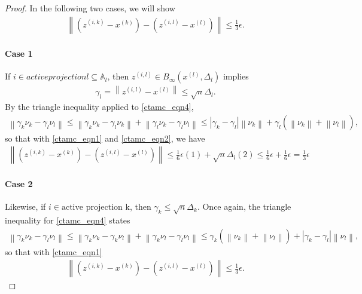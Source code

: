 \documentclass{article}
\theoremstyle{case}
\numberwithin{theorem}{subsection}
\newcommand{\activeconstraintsl}{{\mathbb A_{l}}}
\newcommand{\dk}{\Delta_k}
\newcommand{\dl}{\Delta_l}
\newcommand{\xk}{x^{(k)}}
\newcommand{\xl}{{x^{(l)}}}
\newcommand{\zik}{{z^{(i, k)}}}
\newcommand{\zil}{{z^{(i, l)}}}
\newcommand{\activeprojk}{{\textrm{active projection k}}}
\newcommand{\activeprojl}{{active projection l}}
\begin{document}
\begin{proof}
In the following two cases, we will show
\begin{align*}
\left\|\left(\zik - \xk\right) - \left(\zil - \xl\right)\right\| \le \frac 1 3 \epsilon.
\end{align*}
\paragraph{Case 1}
If $i \in \activeprojl \subseteq \activeconstraintsl$, then $\zil \in B_{\infty}\left(\xl, \dl\right)$ implies
\begin{align}
\gamma_l = \left\|\zil - \xl\right\| \le \sqrt{n}\dl. \label{ctamc_eqn2}
\end{align}
By the triangle inequality applied to \cref{ctamc_eqn4},
\begin{align*}
\left\|\gamma_k \nu_k - \gamma_l \nu_l \right\| 
\le \left\|\gamma_k \nu_k - \gamma_l \nu_k \right\| + \left\| \gamma_l \nu_k - \gamma_l \nu_l \right\| 
\le \left|\gamma_k - \gamma_l\right|\left\|\nu_k\right\| + \gamma_l \left(\left\|\nu_k\right\| + \left\|\nu_l \right\|\right),
\end{align*}
so that with \cref{ctamc_eqn1} and \cref{ctamc_eqn2}, we have
\begin{align*}
\left\|\left(\zik - \xk\right) - \left(\zil - \xl\right)\right\|
\le \frac 1 6 \epsilon (1) + \sqrt{n} \dl (2)
\le \frac 1 6 \epsilon + \frac 1 6 \epsilon = \frac 1 3 \epsilon
\end{align*}
\paragraph{Case 2}
Likewise, if $i \in \activeprojk$, then $\gamma_k \le \sqrt{n}\dk$.
Once again, the triangle inequality for \cref{ctamc_eqn4} states
\begin{align*}
\left\|\gamma_k \nu_k - \gamma_l \nu_l \right\| 
\le \left\|\gamma_k \nu_k - \gamma_k \nu_l \right\| + \left\| \gamma_k \nu_l - \gamma_l \nu_l \right\| 
\le \gamma_k \left(\left\|\nu_k\right\| + \left\|\nu_l \right\|\right) + \left|\gamma_k - \gamma_l\right|\left\|\nu_l\right\|,
\end{align*}
so that with \cref{ctamc_eqn1}
\begin{align*}
\left\|\left(\zik - \xk\right) - \left(\zil - \xl\right)\right\| \le \frac 1 3 \epsilon.
\end{align*}


\end{proof}
\end{document}
